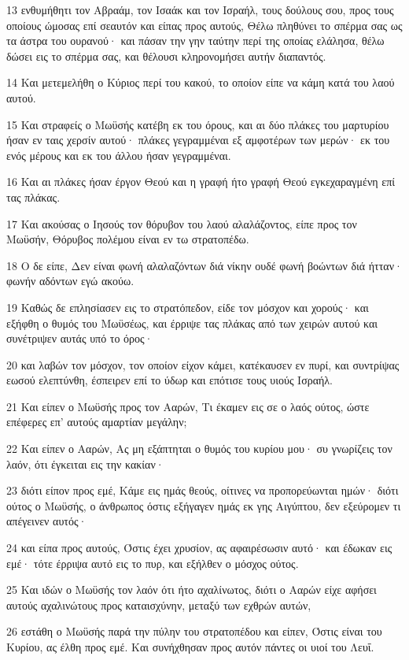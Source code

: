 \par 13 ενθυμήθητι τον Αβραάμ, τον Ισαάκ και τον Ισραήλ, τους δούλους σου, προς τους οποίους ώμοσας επί σεαυτόν και είπας προς αυτούς, Θέλω πληθύνει το σπέρμα σας ως τα άστρα του ουρανού· και πάσαν την γην ταύτην περί της οποίας ελάλησα, θέλω δώσει εις το σπέρμα σας, και θέλουσι κληρονομήσει αυτήν διαπαντός.
\par 14 Και μετεμελήθη ο Κύριος περί του κακού, το οποίον είπε να κάμη κατά του λαού αυτού.
\par 15 Και στραφείς ο Μωϋσής κατέβη εκ του όρους, και αι δύο πλάκες του μαρτυρίου ήσαν εν ταις χερσίν αυτού· πλάκες γεγραμμέναι εξ αμφοτέρων των μερών· εκ του ενός μέρους και εκ του άλλου ήσαν γεγραμμέναι.
\par 16 Και αι πλάκες ήσαν έργον Θεού και η γραφή ήτο γραφή Θεού εγκεχαραγμένη επί τας πλάκας.
\par 17 Και ακούσας ο Ιησούς τον θόρυβον του λαού αλαλάζοντος, είπε προς τον Μωϋσήν, Θόρυβος πολέμου είναι εν τω στρατοπέδω.
\par 18 Ο δε είπε, Δεν είναι φωνή αλαλαζόντων διά νίκην ουδέ φωνή βοώντων διά ήτταν· φωνήν αδόντων εγώ ακούω.
\par 19 Καθώς δε επλησίασεν εις το στρατόπεδον, είδε τον μόσχον και χορούς· και εξήφθη ο θυμός του Μωϋσέως, και έρριψε τας πλάκας από των χειρών αυτού και συνέτριψεν αυτάς υπό το όρος·
\par 20 και λαβών τον μόσχον, τον οποίον είχον κάμει, κατέκαυσεν εν πυρί, και συντρίψας εωσού ελεπτύνθη, έσπειρεν επί το ύδωρ και επότισε τους υιούς Ισραήλ.
\par 21 Και είπεν ο Μωϋσής προς τον Ααρών, Τι έκαμεν εις σε ο λαός ούτος, ώστε επέφερες επ' αυτούς αμαρτίαν μεγάλην;
\par 22 Και είπεν ο Ααρών, Ας μη εξάπτηται ο θυμός του κυρίου μου· συ γνωρίζεις τον λαόν, ότι έγκειται εις την κακίαν·
\par 23 διότι είπον προς εμέ, Κάμε εις ημάς θεούς, οίτινες να προπορεύωνται ημών· διότι ούτος ο Μωϋσής, ο άνθρωπος όστις εξήγαγεν ημάς εκ γης Αιγύπτου, δεν εξεύρομεν τι απέγεινεν αυτός·
\par 24 και είπα προς αυτούς, Όστις έχει χρυσίον, ας αφαιρέσωσιν αυτό· και έδωκαν εις εμέ· τότε έρριψα αυτό εις το πυρ, και εξήλθεν ο μόσχος ούτος.
\par 25 Και ιδών ο Μωϋσής τον λαόν ότι ήτο αχαλίνωτος, διότι ο Ααρών είχε αφήσει αυτούς αχαλινώτους προς καταισχύνην, μεταξύ των εχθρών αυτών,
\par 26 εστάθη ο Μωϋσής παρά την πύλην του στρατοπέδου και είπεν, Όστις είναι του Κυρίου, ας έλθη προς εμέ. Και συνήχθησαν προς αυτόν πάντες οι υιοί του Λευΐ.
